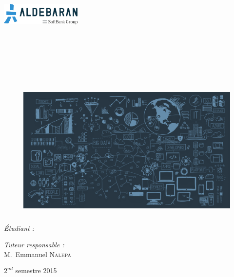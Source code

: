 \begin{center}

\begin{minipage}[t]{1.1\textwidth}
  \begin{flushright}
    \includegraphics [width=40mm,height=12mm]{images/aldebaran_logo.png} \\[0.5cm]
  \end{flushright}
\end{minipage} \\[2cm]

\textsc{\Large \reportsubject}\\[1cm]
\HRule \\[0.25cm]
\textsc{\Large \reporttitle}
{
\HRule \\[2cm]
\begin{figure}[h]
	\centering\includegraphics[width=14cm,height=7cm]{images/main_picture.png}
\end{figure}
\bigbreak\bigbreak\bigbreak\bigbreak
\begin{minipage}[t]{0.3\textwidth}
  \begin{flushleft} \large
    \emph{\Large{Étudiant :}}\\ 
    \reportauthor
  \end{flushleft}
\end{minipage}
\begin{minipage}[ht]{0.6\textwidth}
  \begin{flushright} \large
    \emph{\Large{Tuteur responsable :}} \\
    \Large{M.~Emmanuel \textsc{Nalepa}}
  \end{flushright}
\end{minipage}
}
\vfill

{\large $2^{nd}$ semestre 2015}

\thispagestyle{empty} %

\end{center}

